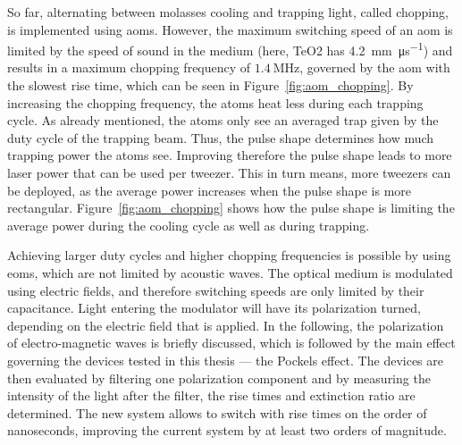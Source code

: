 So far, alternating between molasses cooling and trapping light, called chopping, is implemented using \acp{aom}. However, the maximum switching speed of an \ac{aom} is limited by the speed of sound in the medium (here, TeO2 has \SI{4.2}{\milli\meter\per\micro\second}) and results in a maximum chopping frequency of $\SI{1.4}{\mega\hertz}$, governed by the \ac{aom} with the slowest rise time, which can be seen in Figure~\ref{fig:aom_chopping}. By increasing the chopping frequency, the atoms heat less during each trapping cycle. As already mentioned, the atoms only see an averaged trap given by the duty cycle of the trapping beam. Thus, the pulse shape determines how much trapping power the atoms see. Improving therefore the pulse shape leads to more laser power that can be used per tweezer. This in turn means, more tweezers can be deployed, as the average power increases when the pulse shape is more rectangular. Figure~\ref{fig:aom_chopping} shows how the pulse shape is limiting the average power during the cooling cycle as well as during trapping.

\begin{figure}[tbp]%
\end{figure}

Achieving larger duty cycles and higher chopping frequencies is possible by using \acp{eom}, which are not limited by acoustic waves. The optical medium is modulated using electric fields, and therefore switching speeds are only limited by their capacitance. Light entering the modulator will have its polarization turned, depending on the electric field that is applied. In the following, the polarization of electro-magnetic waves is briefly discussed, which is followed by the main effect governing the devices tested in this thesis --- the Pockels effect. The devices are then evaluated by filtering one polarization component and by measuring the intensity of the light after the filter, the rise times and extinction ratio are determined. The new system allows to switch with rise times on the order of nanoseconds, improving the current system by at least two orders of magnitude.

